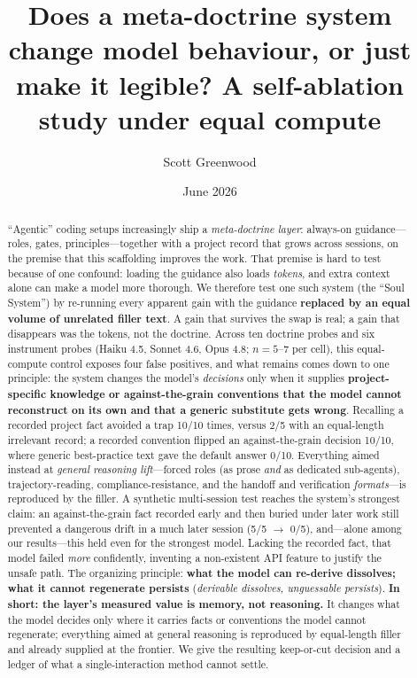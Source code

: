 \documentclass[11pt]{article}
\title{Does a meta-doctrine system change model behaviour, or just make it
legible? A self-ablation study under equal compute}
\author{Scott Greenwood}
\date{June 2026}
\begin{document}
\maketitle

\begin{abstract}
``Agentic'' coding setups increasingly ship a \emph{meta-doctrine layer}: always-on
guidance---roles, gates, principles---together with a project record that grows across
sessions, on the premise that this scaffolding improves the work. That premise is hard
to test because of one confound: loading the guidance also loads \emph{tokens}, and extra
context alone can make a model more thorough. We therefore test one such system (the
``Soul System'') by re-running every apparent gain with the guidance \textbf{replaced by an
equal volume of unrelated filler text}. A gain that survives the swap is real; a gain
that disappears was the tokens, not the doctrine. Across ten doctrine probes and six
instrument probes (Haiku 4.5, Sonnet 4.6, Opus 4.8; $n = 5$--$7$ per cell), this
equal-compute control exposes four false positives, and what remains comes down to one
principle: the system changes the model's \emph{decisions} only when it supplies
\textbf{project-specific knowledge or against-the-grain conventions that the model cannot
reconstruct on its own and that a generic substitute gets wrong}. Recalling a recorded
project fact avoided a trap 10/10 times, versus 2/5 with an equal-length irrelevant
record; a recorded convention flipped an against-the-grain decision 10/10, where generic
best-practice text gave the default answer 0/10. Everything aimed instead at \emph{general
reasoning lift}---forced roles (as prose \emph{and} as dedicated sub-agents),
trajectory-reading, compliance-resistance, and the handoff and verification
\emph{formats}---is reproduced by the filler. A synthetic multi-session test reaches the
system's strongest claim: an against-the-grain fact recorded early and then buried under
later work still prevented a dangerous drift in a much later session (5/5 $\rightarrow$ 0/5),
and---alone among our results---this held even for the strongest model. Lacking the
recorded fact, that model failed \emph{more} confidently, inventing a non-existent API
feature to justify the unsafe path. The organizing principle: \textbf{what the model can
re-derive dissolves; what it cannot regenerate persists} (\emph{derivable dissolves,
unguessable persists}). \textbf{In short: the layer's measured value is memory, not
reasoning.} It changes what the model decides only where it carries facts or conventions
the model cannot regenerate; everything aimed at general reasoning is reproduced by
equal-length filler and already supplied at the frontier. We give the resulting
keep-or-cut decision and a ledger of what a single-interaction method cannot settle.
\end{abstract}
\end{document}
